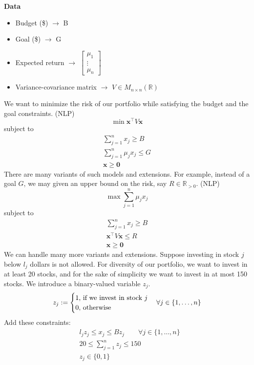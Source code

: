 \textbf{Data}
\begin{itemize}
    \item Budget (\$) $\rightarrow$ B
    \item Goal (\$) $\rightarrow$ G
    \item Expected return $\rightarrow$
    $\begin{bmatrix}
        \mu_1\\
        \vdots\\
        \mu_n
    \end{bmatrix}$
    \item Variance-covariance matrix $\rightarrow$ 
    $V\in M_{n\times n}(\mathbb{R})$
\end{itemize}
We want to minimize the risk of our portfolio while satisfying the budget and
the goal constraints. (NLP)
\[\min \mathbf{x}^\top  V\mathbf{x}\]
subject to
\begin{align*}
    \sum_{j = 1}^{n}x_j\ge B\\
    \sum_{j = 1}^{n}\mu_jx_j\le G\\
    \mathbf{x}\ge \mathbf{0}
\end{align*}
There are many variants of such models and extensions. For example, instead
of a goal $G$, we may given an upper bound on the risk, say 
$R\in\mathbb{R}_{>0}$. (NLP)
\[\max \sum_{j = 1}^{n}\mu_jx_j\]
subject to
\begin{align*}
    \sum_{j = 1}^{n}x_j\ge B\\
    \mathbf{x}^\top  V\mathbf{x}\le R\\
    \mathbf{x}\ge \mathbf{0}
\end{align*}
We can handle many more variants and extensions. Suppose investing in stock
$j$ below $l_j$ dollars is not allowed. For diversity of our portfolio, we
want to invest in at least 20 stocks, and for the sake of simplicity we want
to invest in at most 150 stocks. We introduce a binary-valued variable $z_j$.
\[z_j:=
\begin{cases}
    1 \text{, if we invest in stock $j$}\\
    0 \text{, otherwise}
\end{cases}
\forall j\in\{1,\dots,n\}\\
\]
Add these constraints:
\begin{align*}
    &l_jz_j\le x_j\le Bz_j\qquad \forall j\in\{1,\dots,n\}\\
    &20\le \sum_{j = 1}^{n}z_j\le 150\\
    &z_j\in\{0,1\}
\end{align*}